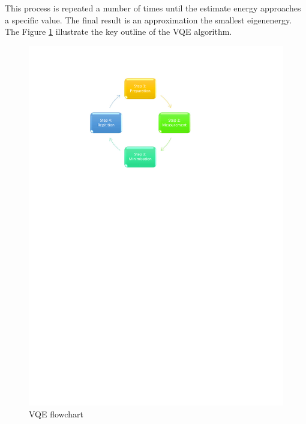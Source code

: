 \documentclass[12pt]{article}
\begin{document}
This process is repeated a number of times until the estimate energy approaches a specific value. The final result is an approximation the smallest eigenenergy. The Figure \ref{VQE} illustrate the key outline of the VQE algorithm.
\begin{figure}[H]
\begin{center}
\includegraphics[scale=0.75]{VQEdiagram.pdf}
\end{center}
\caption{VQE flowchart}\label{VQE}
\end{figure}
\end{document}
